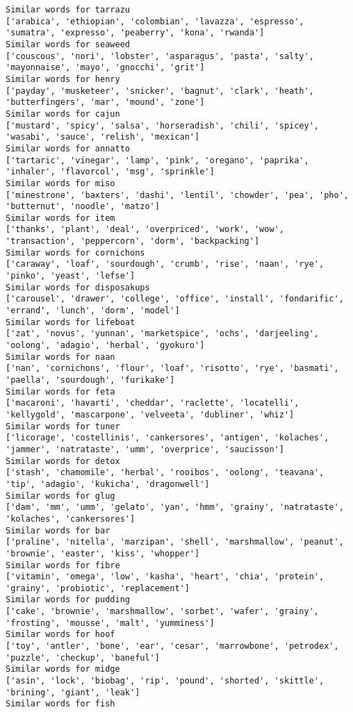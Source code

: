 \documentclass[11pt]{article}
\begin{document}
\begin{Verbatim}[commandchars=\\\{\}]
Similar words for tarrazu
['arabica', 'ethiopian', 'colombian', 'lavazza', 'espresso', 'sumatra', 'expresso', 'peaberry', 'kona', 'rwanda']
Similar words for seaweed
['couscous', 'nori', 'lobster', 'asparagus', 'pasta', 'salty', 'mayonnaise', 'mayo', 'gnocchi', 'grit']
Similar words for henry
['payday', 'musketeer', 'snicker', 'bagnut', 'clark', 'heath', 'butterfingers', 'mar', 'mound', 'zone']
Similar words for cajun
['mustard', 'spicy', 'salsa', 'horseradish', 'chili', 'spicey', 'wasabi', 'sauce', 'relish', 'mexican']
Similar words for annatto
['tartaric', 'vinegar', 'lamp', 'pink', 'oregano', 'paprika', 'inhaler', 'flavorcol', 'msg', 'sprinkle']
Similar words for miso
['minestrone', 'baxters', 'dashi', 'lentil', 'chowder', 'pea', 'pho', 'butternut', 'noodle', 'matzo']
Similar words for item
['thanks', 'plant', 'deal', 'overpriced', 'work', 'wow', 'transaction', 'peppercorn', 'dorm', 'backpacking']
Similar words for cornichons
['caraway', 'loaf', 'sourdough', 'crumb', 'rise', 'naan', 'rye', 'pinko', 'yeast', 'lefse']
Similar words for disposakups
['carousel', 'drawer', 'college', 'office', 'install', 'fondarific', 'errand', 'lunch', 'dorm', 'model']
Similar words for lifeboat
['zat', 'novus', 'yunnan', 'marketspice', 'ochs', 'darjeeling', 'oolong', 'adagio', 'herbal', 'gyokuro']
Similar words for naan
['nan', 'cornichons', 'flour', 'loaf', 'risotto', 'rye', 'basmati', 'paella', 'sourdough', 'furikake']
Similar words for feta
['macaroni', 'havarti', 'cheddar', 'raclette', 'locatelli', 'kellygold', 'mascarpone', 'velveeta', 'dubliner', 'whiz']
Similar words for tuner
['licorage', 'costellinis', 'cankersores', 'antigen', 'kolaches', 'jammer', 'natrataste', 'umm', 'overprice', 'saucisson']
Similar words for detox
['stash', 'chamomile', 'herbal', 'rooibos', 'oolong', 'teavana', 'tip', 'adagio', 'kukicha', 'dragonwell']
Similar words for glug
['dam', 'mm', 'umm', 'gelato', 'yan', 'hmm', 'grainy', 'natrataste', 'kolaches', 'cankersores']
Similar words for bar
['praline', 'nitella', 'marzipan', 'shell', 'marshmallow', 'peanut', 'brownie', 'easter', 'kiss', 'whopper']
Similar words for fibre
['vitamin', 'omega', 'low', 'kasha', 'heart', 'chia', 'protein', 'grainy', 'probiotic', 'replacement']
Similar words for pudding
['cake', 'brownie', 'marshmallow', 'sorbet', 'wafer', 'grainy', 'frosting', 'mousse', 'malt', 'yumminess']
Similar words for hoof
['toy', 'antler', 'bone', 'ear', 'cesar', 'marrowbone', 'petrodex', 'puzzle', 'checkup', 'baneful']
Similar words for midge
['asin', 'lock', 'biobag', 'rip', 'pound', 'shorted', 'skittle', 'brining', 'giant', 'leak']
Similar words for fish

\end{Verbatim}
\end{document}
